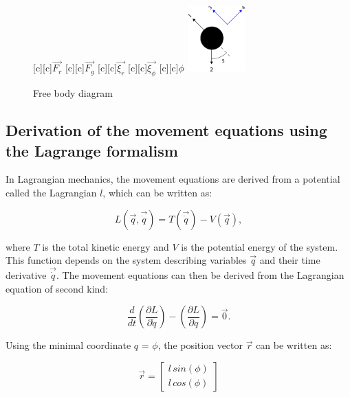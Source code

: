 \documentclass[12pt,bibstyle=none,pagenumberinfooter]{ifmdocument}
\begin{document}
\begin{figure}[h]
    \begin{center}
        {
            \psfragscanon
            [c][c]{$\vec{F_r}$}
            [c][c]{$\vec{F_g}$}
            [c][c]{$\vec{\xi_r}$}
            [c][c]{$\vec{\xi_{\phi}}$}
            [c][c]{$\phi$}
            \includegraphics[width=0.2\textwidth]{Figures/Zeichnung2.eps}}
    \end{center}
    \caption{Free body diagram}
    \label{fig:free body}
\end{figure}

\subsection{Derivation of the movement equations using the Lagrange formalism}
\label{sec: lagrange}

In Lagrangian mechanics, the movement equations are derived from a potential called the Lagrangian $l$, which can be written as:

\begin{equation}
    \label{eq: Lagrangian}
    L(\Vec{q}, \Vec{\Dot{q}}) = T(\Vec{\Dot{q}}) - V(\Vec{q}),
\end{equation}

where $T$ is the total kinetic energy and $V$ is the potential energy of the system. This function depends on the system describing variables $\Vec{q}$ and their time derivative $\Vec{\Dot{q}}$. The movement equations can then be derived from the Lagrangian equation of second kind:

\begin{equation}
    \label{eq: secondKindLagrangian}
    \frac{d}{dt}\left(\frac{\partial L}{\partial \Dot{q}}\right) - \left(\frac{\partial L}{\partial q}  \right) = \Vec{0}.
\end{equation}

Using the minimal coordinate $q$ = $\phi$, the position vector $\Vec{r}$ can be written as:

\begin{equation}
    \Vec{r} = \begin{bmatrix}
        l\,sin(\phi) \\ l\, cos(\phi)
    \end{bmatrix}
\end{equation}
\end{document}
